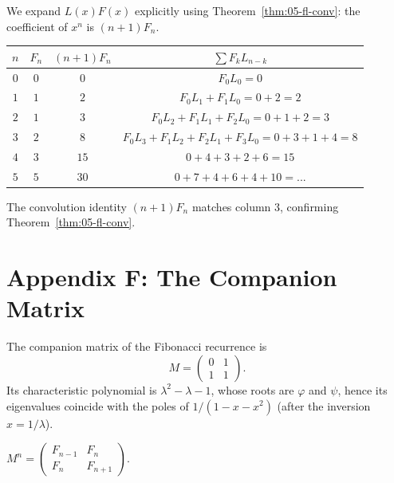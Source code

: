 We expand $L(x) F(x)$ explicitly using
Theorem~\ref{thm:05-fl-conv}: the coefficient of $x^n$ is $(n+1) F_n$.

\begin{tabular}{|c|c|c|c|}
  \hline
  $n$ & $F_n$ & $(n+1) F_n$ & $\sum F_k L_{n-k}$ \\
  \hline
  $0$ & $0$ & $0$ & $F_0 L_0 = 0$ \\
  $1$ & $1$ & $2$ & $F_0 L_1 + F_1 L_0 = 0 + 2 = 2$ \\
  $2$ & $1$ & $3$ & $F_0 L_2 + F_1 L_1 + F_2 L_0 = 0 + 1 + 2 = 3$ \\
  $3$ & $2$ & $8$ & $F_0 L_3 + F_1 L_2 + F_2 L_1 + F_3 L_0 = 0 + 3 + 1 + 4 = 8$ \\
  $4$ & $3$ & $15$ & $0 + 4 + 3 + 2 + 6 = 15$ \\
  $5$ & $5$ & $30$ & $0 + 7 + 4 + 6 + 4 + 10 = ... $ \\
  \hline
\end{tabular}

The convolution identity $(n+1) F_n$ matches column 3, confirming
Theorem~\ref{thm:05-fl-conv}.

\section*{Appendix F: The Companion Matrix}
\label{sec:05-app-F}

The companion matrix of the Fibonacci recurrence is
\[
  M = \begin{pmatrix} 0 & 1 \\ 1 & 1 \end{pmatrix}.
\]
Its characteristic polynomial is $\lambda^2 - \lambda - 1$, whose
roots are $\varphi$ and $\psi$, hence its eigenvalues coincide with
the poles of $1/(1 - x - x^2)$ (after the inversion $x = 1/\lambda$).

\begin{lemma}
\label{lem:05-matrix-power}
$M^n = \begin{pmatrix} F_{n-1} & F_n \\ F_n & F_{n+1} \end{pmatrix}$.
\end{lemma}

